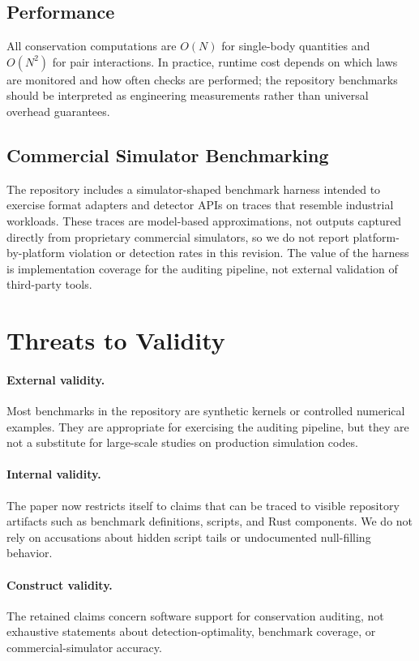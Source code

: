 \documentclass[11pt,a4paper]{article}
\begin{document}
\subsection{Performance}
All conservation computations are $O(N)$ for single-body quantities and $O(N^2)$ for pair interactions. In practice, runtime cost depends on which laws are monitored and how often checks are performed; the repository benchmarks should be interpreted as engineering measurements rather than universal overhead guarantees.

\subsection{Commercial Simulator Benchmarking}
\label{sec:commercial-bench}

The repository includes a simulator-shaped benchmark harness intended
to exercise format adapters and detector APIs on traces that resemble
industrial workloads.  These traces are model-based approximations, not
outputs captured directly from proprietary commercial simulators, so we
do not report platform-by-platform violation or detection rates in this
revision.  The value of the harness is implementation coverage for the
auditing pipeline, not external validation of third-party tools.

\section{Threats to Validity}
\label{sec:threats}

\paragraph{External validity.}
Most benchmarks in the repository are synthetic kernels or controlled
numerical examples.  They are appropriate for exercising the auditing
pipeline, but they are not a substitute for large-scale studies on
production simulation codes.

\paragraph{Internal validity.}
The paper now restricts itself to claims that can be traced to visible
repository artifacts such as benchmark definitions, scripts, and Rust
components.  We do not rely on accusations about hidden script tails or
undocumented null-filling behavior.

\paragraph{Construct validity.}
The retained claims concern software support for conservation auditing,
not exhaustive statements about detection-optimality, benchmark
coverage, or commercial-simulator accuracy.
\end{document}
